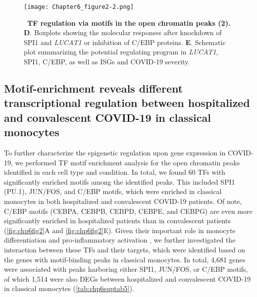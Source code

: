 \documentclass{book}
\begin{document}
\begin{refsection}
\begin{figure}%
  \centering
  \addtocounter{figure}{-1}
  \texttt{[image: Chapter6\_figure2-2.png]}
  \caption{
    ~\textbf{TF regulation via motifs in the open chromatin peaks (2).}
    \textbf{D}. Boxplots showing the molecular responses after knockdown of SPI1 and \textit{LUCAT1} or inhibition of C/EBP proteins.
    \textbf{E}. Schematic plot summarizing the potential regulating program in \textit{LUCAT1}, SPI1, C/EBP, as well as ISGs and COVID-19 severity.
  }
\end{figure}

\subsection*{Motif-enrichment reveals different transcriptional regulation between hospitalized and convalescent COVID-19 in classical monocytes}
To further characterize the epigenetic regulation upon gene expression in COVID-19, we performed TF motif enrichment analysis for the open chromatin peaks identified in each cell type and condition.
In total, we found 60 TFs with significantly enriched motifs among the identified peaks.
This included SPI1 (PU.1), JUN/FOS, and C/EBP motifs, which were enriched in classical monocytes in both hospitalized and convalescent COVID-19 patients.
Of note, C/EBP motifs (CEBPA, CEBPB, CEBPD, CEBPE, and CEBPG) are even more significantly enriched in hospitalized patients than in convalescent patients (\ref{fig:chp6fig2}A and \ref{fig:chp6fig2}E).
Given their important role in monocyte differentiation and pro-inflammatory activation \cite{Rosenbauer2007Transcription}, we further investigated the interaction between these TFs and their targets, which were identified based on the genes with motif-binding peaks in classical monocytes.
In total, 4,681 genes were associated with peaks harboring either SPI1, JUN/FOS, or C/EBP motifs, of which 1,514 were also DEGs between hospitalized and convalescent COVID-19 in classical monocytes (\ref{tab:chp6suptab5}).


\end{refsection}
\end{document}
